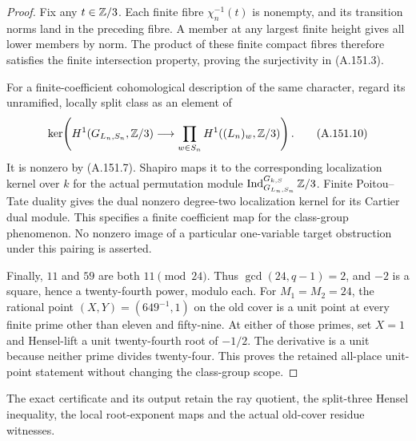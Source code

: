 \begin{proof}
Fix any \(t\in\mathbb Z/3\).
Each finite fibre \(\chi_n^{-1}(t)\)
is nonempty, and its transition norms
land in the preceding fibre.
A member at any largest finite height
gives all lower members by norm.
The product of these finite compact
fibres therefore satisfies the finite
intersection property, proving the
surjectivity in (A.151.3).

For a finite-coefficient cohomological
description of the same character,
regard its unramified, locally split
class as an element of
\[
 \ker\!\left(H^1(G_{L_n,S_n},\mathbb Z/3)
                 \longrightarrow\prod_{w\in S_n}H^1((L_n)_w,\mathbb Z/3)\right).
\tag{A.151.10}
\]
It is nonzero by (A.151.7).
Shapiro maps it to the corresponding
localization kernel over \(k\) for
the actual permutation module
\(\operatorname{Ind}_{G_{L_n,S_n}}^{G_{k,S}}\mathbb Z/3\).
Finite Poitou--Tate duality
\cite[I, Theorem 4.10(a)]{BIR_MilneADT} gives
the dual nonzero degree-two
localization kernel for its Cartier
dual module.
This specifies a finite coefficient
map for the class-group phenomenon.
No nonzero image of a particular
one-variable target obstruction
under this pairing is asserted.

Finally, \(11\) and \(59\) are both
\(11\pmod{24}\).
Thus \(\gcd(24,q-1)=2\), and
\(-2\) is a square, hence a
twenty-fourth power, modulo each.
For \(M_1=M_2=24\), the rational
point \((X,Y)=(649^{-1},1)\) on
the old cover is a unit point at
every finite prime other than
eleven and fifty-nine.
At either of those primes, set
\(X=1\) and Hensel-lift a unit
twenty-fourth root of \(-1/2\).
The derivative is a unit because
neither prime divides twenty-four.
This proves the retained all-place
unit-point statement without changing
the class-group scope.
\end{proof}

The exact certificate
and its output retain the ray quotient,
the split-three Hensel inequality,
the local root-exponent maps and the
actual old-cover residue witnesses.
